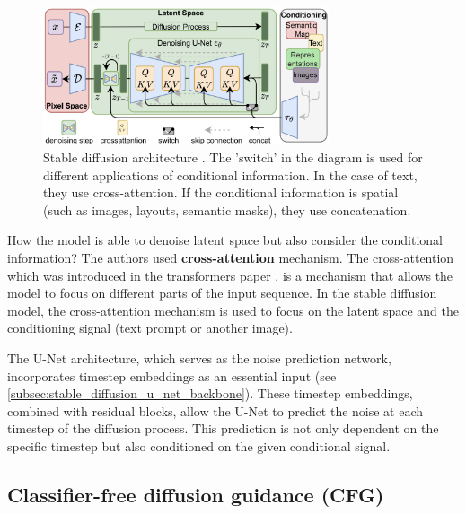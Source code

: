 \begin{figure}
    \centering
    \includegraphics[width=0.75\textwidth]{images/diffusion_models/stable_diffusion/architecture.png}
    \caption{Stable diffusion architecture \cite{stable_diffusion}. The 'switch' in the diagram is used for different applications of conditional information. In the case of text, they use cross-attention. If the conditional information is spatial (such as images, layouts, semantic masks), they use concatenation.}
    \label{fig:stable_diffusion_architecture}
\end{figure}

How the model is able to denoise latent space but also consider the conditional information? The authors used \textbf{cross-attention} mechanism. The cross-attention which was introduced in the transformers paper \cite{transformer}, is a mechanism that allows the model to focus on different parts of the input sequence. In the stable diffusion model, the cross-attention mechanism is used to focus on the latent space and the conditioning signal (text prompt or another image). 

The U-Net architecture, which serves as the noise prediction network, incorporates timestep embeddings as an essential input (see \ref{subsec:stable_diffusion_u_net_backbone}). These timestep embeddings, combined with residual blocks, allow the U-Net to predict the noise at each timestep of the diffusion process. This prediction is not only dependent on the specific timestep but also conditioned on the given conditional signal. 











\subsection{Classifier-free diffusion guidance (CFG)}

\label{subsec:classifier_free_diffusion_guidance}

